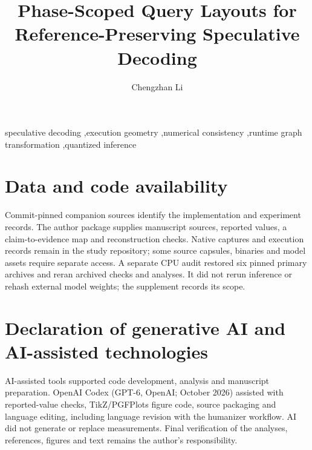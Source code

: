 \documentclass[final,5p,times,twocolumn]{elsarticle}
\begin{document}
\begin{frontmatter}
\title{Phase-Scoped Query Layouts for Reference-Preserving Speculative Decoding}
\author{Chengzhan Li}
\address{University of Electronic Science and Technology of China, Qingshuihe Campus,\\
No. 2006 Xiyuan Avenue, West Hi-Tech Zone, Chengdu, Sichuan 611731, China}
\begin{abstract}\end{abstract}
\begin{keyword}
speculative decoding \sep execution geometry \sep numerical consistency \sep runtime graph transformation \sep quantized inference
\end{keyword}
\end{frontmatter}








\section*{Data and code availability}
Commit-pinned companion sources identify the implementation and experiment records. The author package supplies manuscript sources, reported values, a claim-to-evidence map and reconstruction checks. Native captures and execution records remain in the study repository; some source capsules, binaries and model assets require separate access. A separate CPU audit restored six pinned primary archives and reran archived checks and analyses. It did not rerun inference or rehash external model weights; the supplement records its scope.
\section*{Declaration of generative AI and AI-assisted technologies}
AI-assisted tools supported code development, analysis and manuscript preparation. OpenAI Codex (GPT-6, OpenAI; October 2026) assisted with reported-value checks, TikZ/PGFPlots figure code, source packaging and language editing, including language revision with the humanizer workflow. AI did not generate or replace measurements. Final verification of the analyses, references, figures and text remains the author's responsibility.


\end{document}
